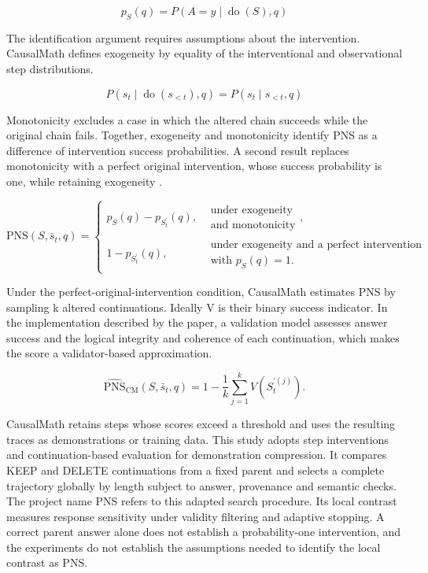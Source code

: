\[
p_S(q)=P(A=y\mid\operatorname{do}(S),q)
\]

The identification argument requires assumptions about the intervention. CausalMath defines exogeneity by equality of the interventional and observational step distributions.

\[
P(s_t\mid\operatorname{do}(s_{<t}),q)=P(s_t\mid s_{<t},q)
\]

Monotonicity excludes a case in which the altered chain succeeds while the original chain fails. Together, exogeneity and monotonicity identify PNS as a difference of intervention success probabilities. A second result replaces monotonicity with a perfect original intervention, whose success probability is one, while retaining exogeneity \cite{NEURIPS2025_b7870bd4}.

\begin{equation}\label{eq:2.3}
\mathrm{PNS}(S,\bar s_t,q)=\begin{cases}p_S(q)-p_{S_t^{\prime}}(q),&\substack{\text{under exogeneity}\\\text{and monotonicity}},\\1-p_{S_t^{\prime}}(q),&\substack{\text{under exogeneity and a perfect intervention}\\\text{with }p_S(q)=1.}\end{cases}
\end{equation}

Under the perfect-original-intervention condition, CausalMath estimates PNS by sampling k altered continuations. Ideally V is their binary success indicator. In the implementation described by the paper, a validation model assesses answer success and the logical integrity and coherence of each continuation, which makes the score a validator-based approximation.

\begin{equation}\label{eq:2.4}
\widehat{\mathrm{PNS}}_{\mathrm{CM}}(S,\bar s_t,q)=1-\frac{1}{k}\sum_{j=1}^{k}V\!\left(S_t^{\prime(j)}\right).
\end{equation}

CausalMath retains steps whose scores exceed a threshold and uses the resulting traces as demonstrations or training data. This study adopts step interventions and continuation-based evaluation for demonstration compression. It compares KEEP and DELETE continuations from a fixed parent and selects a complete trajectory globally by length subject to answer, provenance and semantic checks. The project name PNS refers to this adapted search procedure. Its local contrast measures response sensitivity under validity filtering and adaptive stopping. A correct parent answer alone does not establish a probability-one intervention, and the experiments do not establish the assumptions needed to identify the local contrast as PNS.
